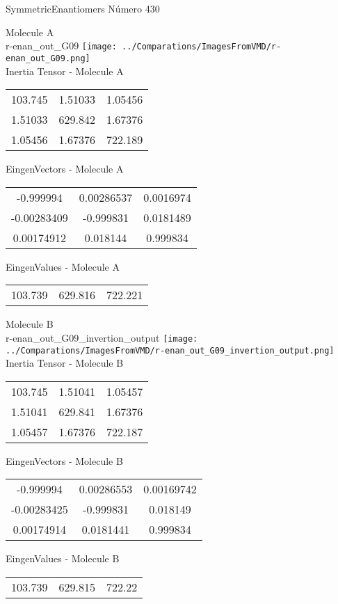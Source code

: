 \vtab[-2cm]
\begin{center}
{\large SymmetricEnantiomers \tab Número 430}
\end{center}
\begin{multicols}{2}
\begin{center}

Molecule A \\ 
r-enan\_out\_G09
\texttt{[image: ../Comparations/ImagesFromVMD/r-enan\_out\_G09.png]}
\\
Inertia Tensor - Molecule A \\
\vtab

\begin{tabular}{|c c c|}
103.745	 & 	1.51033	 & 	1.05456	 \\
1.51033	 & 	629.842	 & 	1.67376	 \\
1.05456	 & 	1.67376	 & 	722.189
\end{tabular}

\vtab
 EingenVectors - Molecule A     \\
\vtab
\begin{tabular}{|c c c|}
-0.999994	 & 	0.00286537	 & 	0.0016974	 \\
-0.00283409	 & 	-0.999831	 & 	0.0181489	 \\
0.00174912	 & 	0.018144	 & 	0.999834
\end{tabular}

\vtab
 EingenValues - Molecule A     \\
\vtab
\begin{tabular}{|c c c|}
103.739	 & 	629.816	 & 	722.221	 \\
\end{tabular}
\columnbreak

Molecule B \\ 
r-enan\_out\_G09\_invertion\_output
\texttt{[image: ../Comparations/ImagesFromVMD/r-enan\_out\_G09\_invertion\_output.png]}
\\
Inertia Tensor - Molecule B \\
\vtab

\begin{tabular}{|c c c|}
103.745	 & 	1.51041	 & 	1.05457	 \\
1.51041	 & 	629.841	 & 	1.67376	 \\
1.05457	 & 	1.67376	 & 	722.187
\end{tabular}

\vtab
 EingenVectors - Molecule B     \\
\vtab
\begin{tabular}{|c c c|}
-0.999994	 & 	0.00286553	 & 	0.00169742	 \\
-0.00283425	 & 	-0.999831	 & 	0.018149	 \\
0.00174914	 & 	0.0181441	 & 	0.999834
\end{tabular}

\vtab
 EingenValues - Molecule B     \\
\vtab
\begin{tabular}{|c c c|}
103.739	 & 	629.815	 & 	722.22	 \\
\end{tabular}

\end{center}
\end{multicols}
